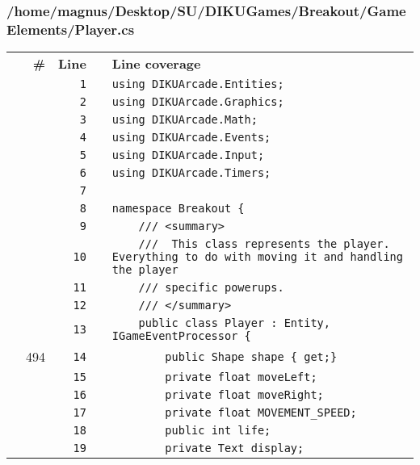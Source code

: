 \documentclass[a4paper,landscape,10pt]{article}
\begin{document}
\subsubsection{/home/magnus/Desktop/SU/DIKUGames/Breakout/GameElements/Player.cs}
\begin{longtable}[l]{lrrll}
\textbf{} & \textbf{\#} & \textbf{Line} & \textbf{} & \textbf{Line coverage}\\
\cellcolor{gray} &  & \verb~1~ & & \verb~using DIKUArcade.Entities;~\\
\cellcolor{gray} &  & \verb~2~ & & \verb~using DIKUArcade.Graphics;~\\
\cellcolor{gray} &  & \verb~3~ & & \verb~using DIKUArcade.Math;~\\
\cellcolor{gray} &  & \verb~4~ & & \verb~using DIKUArcade.Events;~\\
\cellcolor{gray} &  & \verb~5~ & & \verb~using DIKUArcade.Input;~\\
\cellcolor{gray} &  & \verb~6~ & & \verb~using DIKUArcade.Timers;~\\
\cellcolor{gray} &  & \verb~7~ & & \verb~~\\
\cellcolor{gray} &  & \verb~8~ & & \verb~namespace Breakout {~\\
\cellcolor{gray} &  & \verb~9~ & & \verb~    /// <summary>~\\
\cellcolor{gray} &  & \verb~10~ & & \verb~    ///  This class represents the player. Everything to do with moving it and handling the player~\\
\cellcolor{gray} &  & \verb~11~ & & \verb~    /// specific powerups.~\\
\cellcolor{gray} &  & \verb~12~ & & \verb~    /// </summary>~\\
\cellcolor{gray} &  & \verb~13~ & & \verb~    public class Player : Entity, IGameEventProcessor {~\\
\cellcolor{green} & 494 & \verb~14~ & & \verb~        public Shape shape { get;}~\\
\cellcolor{gray} &  & \verb~15~ & & \verb~        private float moveLeft;~\\
\cellcolor{gray} &  & \verb~16~ & & \verb~        private float moveRight;~\\
\cellcolor{gray} &  & \verb~17~ & & \verb~        private float MOVEMENT_SPEED;~\\
\cellcolor{gray} &  & \verb~18~ & & \verb~        public int life;~\\
\cellcolor{gray} &  & \verb~19~ & & \verb~        private Text display;~\\

\end{longtable}
\end{document}
